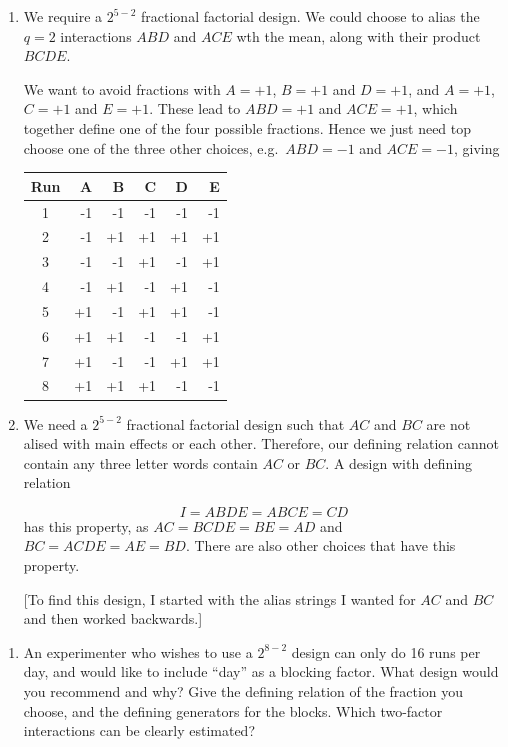 \documentclass[
]{book}
\providecommand{\tightlist}{%
  \setlength{\itemsep}{0pt}\setlength{\parskip}{0pt}}
\theoremstyle{definition}
\theoremstyle{definition}
\theoremstyle{definition}
\theoremstyle{definition}
\theoremstyle{remark}
\begin{document}
\begin{enumerate}
\def\labelenumi{\alph{enumi}.}
\item
  We require a \(2^{5-2}\) fractional factorial design. We could choose to alias the \(q=2\) interactions \(ABD\) and \(ACE\) wth the mean, along with their product \(BCDE\).

  We want to avoid fractions with \(A = +1\), \(B = +1\) and \(D = +1\), and \(A = +1\), \(C = +1\) and \(E = +1\). These lead to \(ABD = +1\) and \(ACE = +1\), which together define one of the four possible fractions. Hence we just need top choose one of the three other choices, e.g.~\(ABD = -1\) and \(ACE = -1\), giving

  \begin{longtable}[]{@{}crrrrr@{}}
  \toprule
  Run & A & B & C & D & E \\
  \midrule
  \endhead
  1 & -1 & -1 & -1 & -1 & -1 \\
  2 & -1 & +1 & +1 & +1 & +1 \\
  3 & -1 & -1 & +1 & -1 & +1 \\
  4 & -1 & +1 & -1 & +1 & -1 \\
  5 & +1 & -1 & +1 & +1 & -1 \\
  6 & +1 & +1 & -1 & -1 & +1 \\
  7 & +1 & -1 & -1 & +1 & +1 \\
  8 & +1 & +1 & +1 & -1 & -1 \\
  \bottomrule
  \end{longtable}
\item
  We need a \(2^{5-2}\) fractional factorial design such that \(AC\) and \(BC\) are not alised with main effects or each other. Therefore, our defining relation cannot contain any three letter words contain \(AC\) or \(BC\). A design with defining relation

  \[
   I = ABDE = ABCE = CD
   \]
  has this property, as \(AC = BCDE = BE = AD\) and \(BC = ACDE = AE = BD\). There are also other choices that have this property.

  {[}To find this design, I started with the alias strings I wanted for \(AC\) and \(BC\) and then worked backwards.{]}
\end{enumerate}

\begin{enumerate}
\def\labelenumi{\arabic{enumi}.}
\setcounter{enumi}{3}
\tightlist
\item
  An experimenter who wishes to use a \(2^{8-2}\) design can only do 16 runs per day, and would like to include ``day'' as a blocking factor. What design would you recommend and why? Give the defining relation of the fraction you choose, and the defining generators for the blocks. Which two-factor interactions can be clearly estimated?
\end{enumerate}
\end{document}
